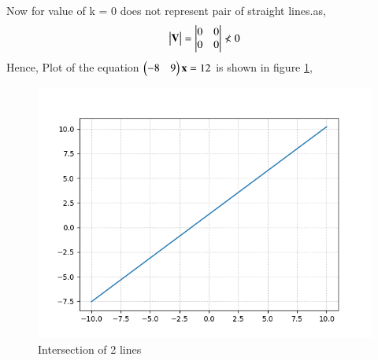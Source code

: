 \documentclass[journal,12pt,twocolumn]{IEEEtran}
\begin{document}
Now for value of k = 0 does not represent pair of straight lines.as,
\begin{align}
\begin{vmatrix}\mathbf{V}\end{vmatrix} = \begin{vmatrix}0&0\\0&0\end{vmatrix} \nless0 
\end{align} 
Hence, Plot of the equation $\begin{pmatrix}-8&9\end{pmatrix}\mathbf{x} = 12$ is shown in figure \ref{Figure_2},
\begin{figure}[ht!]
\centering
\includegraphics[width=\columnwidth]{Figure_2.png}
\caption{Intersection of 2 lines}
\label{Figure_2}
\end{figure}

\end{document}
